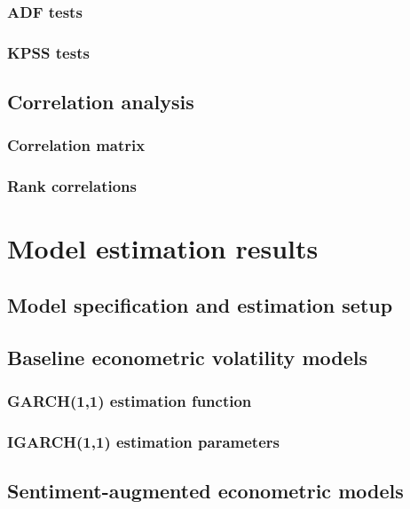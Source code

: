 \documentclass[12pt]{report}
\begin{document}
\subsubsection{ADF tests}

\subsubsection{KPSS tests}

\subsection{Correlation analysis}
\subsubsection{Correlation matrix}

\subsubsection{Rank correlations}


\section{Model estimation results}
\subsection{Model specification and estimation setup}

\subsection{Baseline econometric volatility models}
\subsubsection{GARCH(1,1) estimation function}

\subsubsection{IGARCH(1,1) estimation parameters}

\subsection{Sentiment-augmented econometric models}

\end{document}
